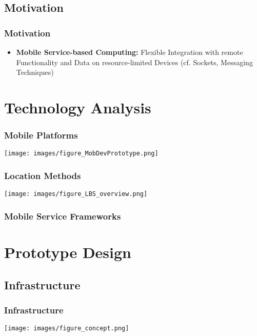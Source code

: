 \documentclass[blue]{beamer}
\begin{document}
\subsection{Motivation}
\frame
{
\frametitle{\textbf{Motivation}}
\begin{itemize}[<+-|alert@+>]
  \item \textbf{Mobile Service-based Computing:} Flexible Integration
  with remote Functionality and Data on resource-limited Devices
  (cf. Sockets, Messaging Techniques)
\end{itemize}
}


\section{Technology Analysis}
\frame
{
\frametitle{\textbf{Mobile Platforms}}
\texttt{[image: images/figure\_MobDevPrototype.png]}
}

\frame
{
\frametitle{\textbf{Location Methods}}
\texttt{[image: images/figure\_LBS\_overview.png]}
}


\frame
{
\frametitle{\textbf{Mobile Service Frameworks}}
}


\section{Prototype Design}

\subsection{Infrastructure}
\frame
{
\frametitle{\textbf{Infrastructure}}
\texttt{[image: images/figure\_concept.png]}
}
\end{document}

